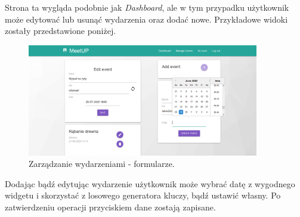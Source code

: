 \documentclass[12pt]{article}
\begin{document}
Strona ta wygląda podobnie jak \textit{Dashboard}, ale w tym przypadku użytkownik może edytować lub usunąć wydarzenia oraz dodać nowe. Przykładowe widoki zostały przedstawione poniżej.

\begin{figure}[H]
\centering
\includegraphics[width=0.9\textwidth]{meetup_manage_form.png}
\caption{Zarządzanie wydarzeniami - formularze.}
\end{figure}

Dodając bądź edytując wydarzenie użytkownik może wybrać datę z wygodnego widgetu i skorzystać z losowego generatora kluczy, bądź ustawić własny. Po zatwierdzeniu operacji przyciskiem dane zostają zapisane.
\end{document}
